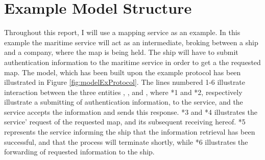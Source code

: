 \section{Example Model Structure}
Throughout this report, I will use a mapping service as an example. In this example the maritime service will act as an intermediate, broking between a ship and a company, where the map is being held. The ship will have to submit authentication information to the maritime service in order to get a the requested map. The model, which has been built upon the example protocol has been illustrated in Figure \ref{fig:modelExProtocol}. The lines numbered 1-6 illustrate interaction between the three entities , , and , where *1 and *2, respectively illustrate a submitting of authentication information, to the service, and the service accepts the information and sends this response. *3 and *4 illustrates the service' request of the requested map, and its subsequent receiving hereof. *5 represents the service informing the ship that the information retrieval has been successful, and that the process will terminate shortly, while *6 illustrates the forwarding of requested information to the ship.

